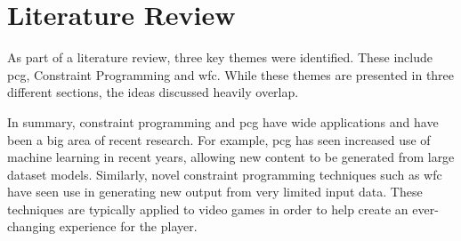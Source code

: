 \chapter{Literature Review}





As part of a literature review, three key themes were identified. These include \acrlong{pcg}, Constraint Programming and \acrlong{wfc}. While these themes are presented in three different sections, the ideas discussed heavily overlap.

In summary, constraint programming and \acrlong{pcg} have wide applications and have been a big area of recent research. For example, \acrshort{pcg} has seen increased use of machine learning in recent years, allowing new content to be generated from large dataset models. Similarly, novel constraint programming techniques such as \acrshort{wfc} have seen use in generating new output from very limited input data. These techniques are typically applied to video games in order to help create an ever-changing experience for the player.

